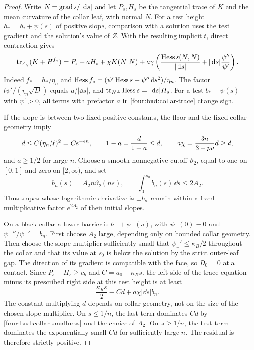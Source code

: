 \begin{proof}
Write $N=\operatorname{grad} s/|\,\mathrm d s|$ and let $P_s,H_s$ be the tangential trace
of $K$ and the mean curvature of the collar leaf, with normal $N$.
For a test height $h_*=b_*+\psi(s)$ of positive slope, comparison
with a solution uses the test gradient and the solution's value of
$Z$.  With the resulting implicit $t$, direct contraction gives
\begin{equation}\label{four:bnd:collar-trace}
 \operatorname{tr}_{A_\chi}(K+H^{f_*})
 =P_s+aH_s+\chi K(N,N)
 +a\chi\left(
 \frac{\operatorname{Hess} s(N,N)}{|\,\mathrm d s|}
       +|\,\mathrm d s|\frac{\psi''}{\psi'}\right).
\end{equation}
Indeed $f_*=h_*/\eta_n$ and
$\operatorname{Hess} f_*=(\psi'\operatorname{Hess} s+\psi''\,\mathrm d s^2)/\eta_n$.
The factor $l\psi'/(\eta_n\sqrt D)$ equals $a/|\dd s|$,
and $\operatorname{tr}_{N^\perp}\operatorname{Hess} s=|\,\mathrm d s|H_s$.  For a test
$b_*-\psi(s)$ with $\psi'>0$, all terms with prefactor $a$ in
\eqref{four:bnd:collar-trace} change sign.

If the slope is between two fixed positive constants, the floor
and the fixed collar geometry imply
\begin{equation}\label{four:bnd:collar-smallness}
 d\le C(\eta_n/\ell)^2=C e^{-\epsilon n},\qquad
 1-a=\frac{d}{1+a}\le d,\qquad
 n\chi=\frac{3n}{3+pv}d\ge d,
\end{equation}
and $a\ge1/2$ for large $n$.
Choose a smooth nonnegative cutoff $\vartheta_2$, equal to one on
$[0,1]$ and zero on $[2,\infty)$, and set
\[
 b_n(s)=A_2n\vartheta_2(ns),\qquad
 \int_0^{s_0}b_n(s)\,\dd s\le2A_2.
\]
Thus slopes whose logarithmic derivative is $\pm b_n$ remain within
a fixed multiplicative factor $e^{2A_2}$ of their initial slopes.

On a black collar a lower barrier is $b_-+\psi_-(s)$, with
$\psi_-(0)=0$ and $\psi_-''/\psi_-'=b_n$.
First choose $A_2$ large, depending only on bounded collar geometry.
Then choose the slope multiplier sufficiently small that
$\psi_-'\le\kappa_B/2$ throughout the collar and that its value at
$s_0$ is below the solution by the strict outer-leaf gap.
The direction of its gradient is compatible with the face, so
$D_0=0$ at a contact.  Since $P_s+H_s\ge c_b$ and
$C=a_0-\kappa_Bs$, the left side of the trace equation minus its
prescribed right side at this test height is at least
\begin{equation}\label{four:bnd:lower-residual}
 \frac{\kappa_Bs}{2}-Cd+a\chi|\dd s|b_n.
\end{equation}
The constant multiplying $d$ depends on collar geometry, not on
the size of the chosen slope multiplier.  On $s\le1/n$, the last
term dominates $Cd$ by \eqref{four:bnd:collar-smallness} and the choice
of $A_2$.  On $s\ge1/n$, the first term dominates the exponentially
small $Cd$ for sufficiently large $n$.  The residual is therefore
strictly positive.


\end{proof}
